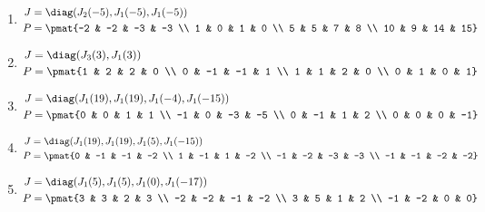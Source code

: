 \begin{enumerate}
\item

\begin{align*}
J &= \diag(J_{2}(-5), J_{1}(-5), J_{1}(-5))\\
P &= \pmat{-2 & -2 & -3 & -3 \\ 1 & 0 & 1 & 0 \\ 5 & 5 & 7 & 8 \\ 10 & 9 & 14 & 15}
\end{align*}

\item

\begin{align*}
J &= \diag(J_{3}(3), J_{1}(3))\\
P &= \pmat{1 & 2 & 2 & 0 \\ 0 & -1 & -1 & 1 \\ 1 & 1 & 2 & 0 \\ 0 & 1 & 0 & 1}
\end{align*}

\item

\begin{align*}
J &= \diag(J_{1}(19), J_{1}(19), J_{1}(-4), J_{1}(-15))\\
P &= \pmat{0 & 0 & 1 & 1 \\ -1 & 0 & -3 & -5 \\ 0 & -1 & 1 & 2 \\ 0 & 0 & 0 & -1}
\end{align*}

\item

\begin{align*}
J &= \diag(J_{1}(19), J_{1}(19), J_{1}(5), J_{1}(-15))\\
P &= \pmat{0 & -1 & -1 & -2 \\ 1 & -1 & 1 & -2 \\ -1 & -2 & -3 & -3 \\ -1 & -1 & -2 & -2}
\end{align*}

\item

\begin{align*}
J &= \diag(J_{1}(5), J_{1}(5), J_{1}(0), J_{1}(-17))\\
P &= \pmat{3 & 3 & 2 & 3 \\ -2 & -2 & -1 & -2 \\ 3 & 5 & 1 & 2 \\ -1 & -2 & 0 & 0}
\end{align*}


\end{enumerate}
